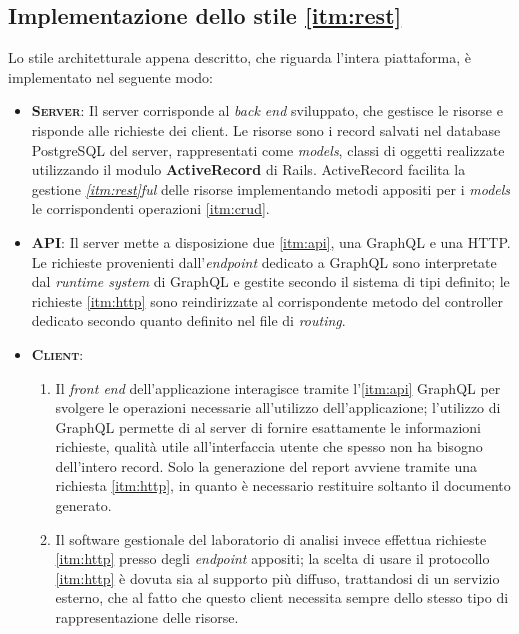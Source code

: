 \subsection{Implementazione dello stile \ref{itm:rest}}
Lo stile architetturale appena descritto, che riguarda l'intera piattaforma, è implementato  nel seguente modo:
\begin{itemize}
    \item \textsc{\textbf{Server}}: Il server corrisponde al \textit{back end} sviluppato, che gestisce le risorse e risponde alle richieste dei client. Le risorse sono i record salvati nel database PostgreSQL del server, rappresentati come \textit{models}, classi di oggetti realizzate utilizzando il modulo \textbf{ActiveRecord} di Rails. ActiveRecord facilita la gestione \textit{\ref{itm:rest}ful} delle risorse implementando metodi appositi per i \textit{models} le corrispondenti operazioni \ref{itm:crud}.
    \item \textsc{\textbf{API}}: Il server mette a disposizione due \ref{itm:api}, una GraphQL e una HTTP. Le richieste provenienti dall'\textit{endpoint} dedicato a GraphQL sono interpretate dal \textit{runtime system} di GraphQL e gestite secondo il sistema di tipi definito; le richieste \ref{itm:http} sono reindirizzate al corrispondente metodo del controller dedicato secondo quanto definito nel file di \textit{routing}.
    \item \textsc{\textbf{Client}}: 
    \begin{enumerate}
        \item Il \textit{front end} dell'applicazione interagisce tramite l'\ref{itm:api} GraphQL per svolgere le operazioni necessarie all'utilizzo dell'applicazione; l'utilizzo di GraphQL permette di al server di fornire esattamente le informazioni richieste, qualità utile all'interfaccia utente che spesso non ha bisogno dell'intero record. Solo la generazione del report avviene tramite una richiesta \ref{itm:http}, in quanto è necessario restituire soltanto il documento generato.
        \item Il software gestionale del laboratorio di analisi invece effettua richieste \ref{itm:http} presso degli \textit{endpoint} appositi; la scelta di usare il protocollo \ref{itm:http} è dovuta sia al supporto più diffuso, trattandosi di un servizio esterno, che al fatto che questo client necessita sempre dello stesso tipo di rappresentazione delle risorse. 
    \end{enumerate} 
\end{itemize}
\vspace{-12pt}
